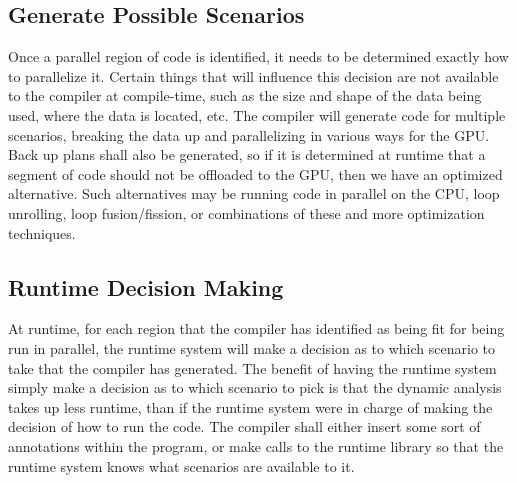 \documentclass[a4paper,12pt]{article}
\begin{document}
\subsection{Generate Possible Scenarios}
Once a parallel region of code is identified, it needs to be determined exactly how to parallelize it.  Certain things that will influence this decision are not available to the compiler at compile-time, such as the size and shape of the data being used, where the data is located, etc.  The compiler will generate code for multiple scenarios, breaking the data up and parallelizing in various ways for the GPU.  Back up plans shall also be generated, so if it is determined at runtime that a segment of code should not be offloaded to the GPU, then we have an optimized alternative.  Such alternatives may be running code in parallel on the CPU, loop unrolling, loop fusion/fission, or combinations of these and more optimization techniques.  


\subsection{Runtime Decision Making}
At runtime, for each region that the compiler has identified as being fit for being run in parallel, the runtime system will make a decision as to which scenario to take that the compiler has generated.  The benefit of having the runtime system simply make a decision as to which scenario to pick is that the dynamic analysis takes up less runtime, than if the runtime system were in charge of making the decision of how to run the code.  The compiler shall either insert some sort of annotations within the program, or make calls to the runtime library so that the runtime system knows what scenarios are available to it.
\end{document}
